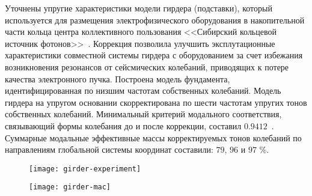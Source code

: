 Уточнены упругие характеристики модели гирдера (подставки), который используется для размещения электрофизического оборудования в накопительной части кольца центра коллективного пользования <<Сибирский кольцевой источник фотонов>>~. Коррекция позволила улучшить эксплутационные характеристики совместной системы гирдера с оборудованием за счет избежания возникновения резонансов от сейсмических колебаний, приводящих к потере качества электронного пучка. Построена модель фундамента, идентифицированная по низшим частотам собственных колебаний. Модель гирдера на упругом основании скорректирована по шести частотам упругих тонов собственных колебаний. Минимальный критерий модального соответствия, связывающий формы колебания до и после коррекции, составил $ 0.9412 $~. Суммарные модальные эффективные массы корректируемых тонов колебаний по направлениям глобальной системы координат составили: $ 79 $, $ 96 $ и $ 97 $ \%. 
\begin{figure}[!htb]
	\centering
	\vspace{-0.5em}
	\begin{minipage}{0.5\textwidth}
		\centering
		\texttt{[image: girder-experiment]} 
		 \label{fig:girder-experiment}
	\end{minipage}
	\hfill
	\begin{minipage}{0.435\textwidth}
		\centering
		\texttt{[image: girder-mac]}
		 \label{fig:girder-mac}
	\end{minipage}
\end{figure}